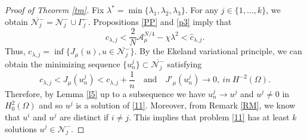 \documentclass[10pt,a4paper]{amsart}
\numberwithin{equation}{section}
\begin{document}
\begin{proof}[Proof of Theorem \ref{tm}]
 Fix $\lambda^*=\min\{\lambda_1, \lambda_2, \lambda_3\}$.
For any $j\in \{1,\dots,k\}$, we obtain 
$\overline{\mathcal{N}_j^-}=\mathcal{N}_j^-\cup \Gamma_j^-$. 
Propositions \ref{PP} and \ref{p3} imply that
$$
 c_{\lambda, j}<\frac{2}{N}\mathcal{A}_{\mu}^{N/4}-\chi \lambda^2< \hat{c}_{\lambda, j}.
$$
Thus, $c_{\lambda, j}=\inf \{J_{\mu}(u), u\in \overline{\mathcal{N}_j^-}\}$. 
By the Ekeland variational principle, we can obtain the minimizing sequence 
$\{u_n^j\}\subset \overline{\mathcal{N}_j^-}$ satisfying
 $$
 c_{\lambda, j} <J_{\mu}(u_n^j)<c_{\lambda, j}+\frac{1}{n}\quad\text{and}\quad
 J'_{\mu}(u_n^j)\to 0, \ in \ H^{-2}(\Omega).
 $$
Therefore, by Lemma \ref{l5} up to a subsequence we have $u_n^j\to u^j$ and $u^j\neq 0$ 
in $H^2_0(\Omega)$ and so $u^j$ is a solution of \eqref{11}.
Moreover, from Remark \ref{RM}, we know that $u^i$ and $u^j$ are distinct if 
$i\neq j.$ This implies that problem \eqref{11} has at least $k$ solutions 
$u^j\in \mathcal{N}_j^-$.
\end{proof}
\end{document}

